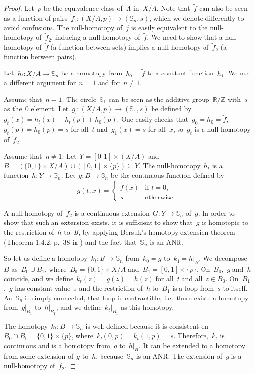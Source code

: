 \documentclass[english,11pt]{article}
\theoremstyle{plain}
\theoremstyle{remark}
\theoremstyle{definition}
\newcommand{\Sp}{\mathbb{S}}
\newcommand{\R}{\mathbb{R}}
\newcommand{\Z}{\mathbb{Z}}
\begin{document}
\begin{proof}
Let~$p$ be the equivalence class of~$A$ in~$X/A$. Note that~$\widetilde{f}$ can also be seen as a function of pairs~$\widetilde{f}_2:(X/A,p)\to (\Sp_n,s)$, which we denote differently to avoid confusions. The null-homotopy of~$f$ is easily equivalent to the null-homotopy of~$\widetilde{f}_2$, inducing a null-homotopy of~$\widetilde{f}$. We need to show that a null-homotopy of~$\widetilde{f}$ (a function between sets) implies a null-homotopy of~$\widetilde{f}_2$ (a function between pairs).

Let~$h_t:X/A\to\Sp_n$ be a homotopy from~$h_0=\widetilde{f}$ to a constant function~$h_1$. We use a different argument for~$n=1$ and for~$n\neq 1$.

Assume that~$n=1$. The circle~$\Sp_1$ can be seen as the additive group~$\R/\Z$ with~$s$ as the~$0$ element. Let~$g_t:(X/A,p)\to (\Sp_1,s)$ be defined by~$g_t(x)=h_t(x)-h_t(p)+h_0(p)$. One easily checks that~$g_0=h_0=\widetilde{f}$,~$g_t(p)=h_0(p)=s$ for all~$t$ and~$g_1(x)=s$ for all~$x$, so~$g_t$ is a null-homotopy of~$\widetilde{f}_2$.

Assume that~$n\neq 1$. Let~$Y=[0,1]\times (X/A)$ and~$B=(\{0,1\}\times X/A)\cup ([0,1]\times\{p\})\subseteq Y$. The null-homotopy~$h_t$ is a function~$h:Y\to\Sp_n$. Let~$g:B\to \Sp_n$ be the continuous function defined by
\begin{equation*}
g(t,x)=\begin{cases}
\widetilde{f}(x)&\text{if }t=0,\\
s&\text{otherwise.}
\end{cases}
\end{equation*}

A null-homotopy of~$\widetilde{f}_2$ is a continuous extension~$G:Y\to \Sp_n$ of~$g$. In order to show that such an extension exists, it is sufficient to show that~$g$ is homotopic to the restriction of~$h$ to~$B$, by applying Borsuk's homotopy extension theorem (Theorem 1.4.2, p.~38 in \cite{Mill01}) and the fact that~$\Sp_n$ is an ANR.

So let us define a homotopy~$k_t:B\to \Sp_n$ from~$k_0=g$ to~$k_1=h|_B$. We decompose~$B$ as~$B_0\cup B_1$, where~$B_0=\{0,1\}\times X/A$ and~$B_1=[0,1]\times \{p\}$. On~$B_0$,~$g$ and~$h$ coincide, and we define~$k_t(z)=g(z)=h(z)$ for all~$t$ and all~$z\in B_0$. On~$B_1$,~$g$ has constant value~$s$ and the restriction of~$h$ to~$B_1$ is a loop from~$s$ to itself. As~$\Sp_n$ is simply connected, that loop is contractible, i.e.~there exists a homotopy from~$g|_{B_1}$ to~$h|_{B_1}$, and we define~$k_t|_{B_1}$ as this homotopy.

The homotopy~$k_t:B\to \Sp_n$ is well-defined because it is consistent on~$B_0\cap B_1=\{0,1\}\times \{p\}$, where~$k_t(0,p)=k_t(1,p)=s$. Therefore,~$k_t$ is continuous and is a homotopy from~$g$ to~$h|_B$. It can be extended to a homotopy from some extension of~$g$ to~$h$, because~$\Sp_n$ is an ANR. The extension of~$g$ is a null-homotopy of~$\widetilde{f}_2$.
\end{proof}
\end{document}
